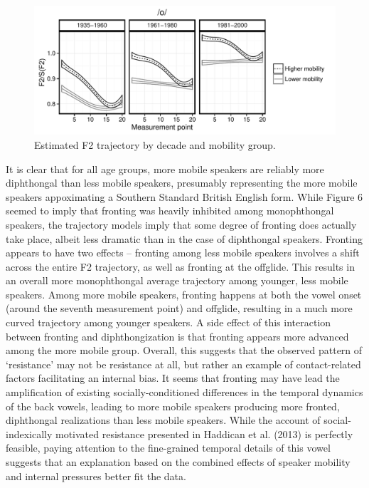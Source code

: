\documentclass[12pt]{article}
\begin{document}
\vspace*{6pt}
\begin{figure}[H]
\centering
\includegraphics[scale=0.9]{owdynamicsclass.pdf}
\caption{Estimated  F2 trajectory by decade and mobility group.}
\end{figure}
\vspace*{6pt}
 It is clear that for all age groups, more mobile speakers are reliably more diphthongal than less mobile speakers, presumably representing the more mobile speakers appoximating a Southern Standard British English form. While Figure 6 seemed to imply that fronting was heavily inhibited among monophthongal speakers, the trajectory models imply that some degree of fronting does actually take place, albeit less dramatic than in the case of diphthongal speakers. Fronting appears to have two effects -- fronting among less mobile speakers involves a shift across the entire F2 trajectory, as well as fronting at the offglide. This results in an overall more monophthongal average trajectory among younger, less mobile speakers. Among more mobile speakers, fronting happens at both the vowel onset (around the seventh measurement point) and offglide, resulting in a much more curved trajectory among younger speakers. A side effect of this interaction between fronting and diphthongization is that fronting appears more advanced among the more mobile group. Overall, this suggests that the observed pattern of `resistance' may not be resistance at all, but rather an example of contact-related factors facilitating an internal bias. It seems that fronting may have lead the amplification of existing socially-conditioned differences in the temporal dynamics of the back vowels, leading to more mobile speakers producing more fronted, diphthongal realizations than less mobile speakers. While the account of social-indexically motivated resistance presented in Haddican et al. (2013) is perfectly feasible, paying attention to the fine-grained temporal details of this vowel suggests that an explanation based on the combined effects of speaker mobility and internal pressures better fit the data.
\end{document}
